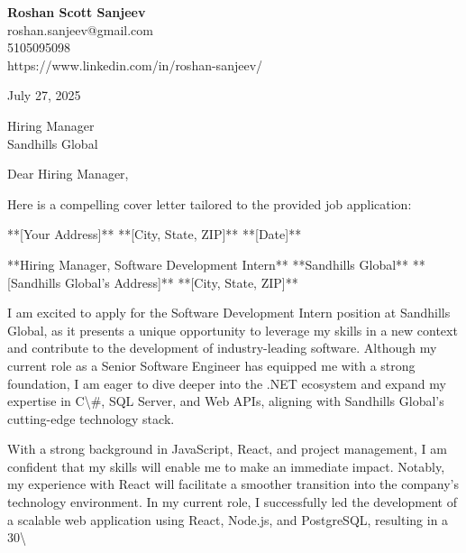 \documentclass[letterpaper,11pt]{article}
\begin{document}
\begin{flushleft}
\textbf{\large Roshan Scott Sanjeev} \\
roshan.sanjeev@gmail.com \\
5105095098 \\
https://www.linkedin.com/in/roshan-sanjeev/
\end{flushleft}

\vspace{0.5in}

July 27, 2025

\vspace{0.25in}

Hiring Manager \\
Sandhills Global \\

\vspace{0.25in}

Dear Hiring Manager,

\vspace{0.1in}

Here is a compelling cover letter tailored to the provided job application:

**[Your Address]**
**[City, State, ZIP]**
**[Date]**

**Hiring Manager, Software Development Intern**
**Sandhills Global**
**[Sandhills Global's Address]**
**[City, State, ZIP]**

I am excited to apply for the Software Development Intern position at Sandhills Global, as it presents a unique opportunity to leverage my skills in a new context and contribute to the development of industry-leading software. Although my current role as a Senior Software Engineer has equipped me with a strong foundation, I am eager to dive deeper into the .NET ecosystem and expand my expertise in C\textbackslash{}#, SQL Server, and Web APIs, aligning with Sandhills Global's cutting-edge technology stack.

With a strong background in JavaScript, React, and project management, I am confident that my skills will enable me to make an immediate impact. Notably, my experience with React will facilitate a smoother transition into the company's technology environment. In my current role, I successfully led the development of a scalable web application using React, Node.js, and PostgreSQL, resulting in a 30\textbackslash{}%
\end{document}
